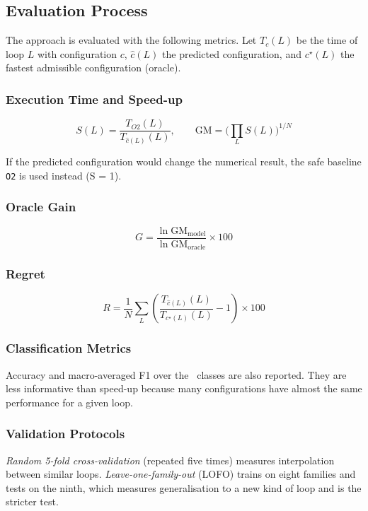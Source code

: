 \subsection{Evaluation Process}

The approach is evaluated with the following metrics. Let $T_c(L)$ be the time of
loop $L$ with configuration $c$, $\hat c(L)$ the predicted configuration, and
$c^{\star}(L)$ the fastest admissible configuration (oracle).

\subsubsection{Execution Time and Speed-up}

\[
S(L)=\frac{T_{O2}(L)}{T_{\hat c(L)}(L)} ,\qquad
\mathrm{GM}=\Big(\prod_{L} S(L)\Big)^{1/N}
\]

If the predicted configuration would change the numerical result, the safe baseline
\texttt{O2} is used instead (S = 1).

\subsubsection{Oracle Gain}

\[
G=\frac{\ln \mathrm{GM}_{\text{model}}}{\ln \mathrm{GM}_{\text{oracle}}}\times100
\]

\subsubsection{Regret}

\[
R=\frac{1}{N}\sum_L\left(\frac{T_{\hat c(L)}(L)}{T_{c^{\star}(L)}(L)}-1\right)\times100
\]

\subsubsection{Classification Metrics}

Accuracy and macro-averaged F1 over the \numConfigs\ classes are also reported.
They are less informative than speed-up because many configurations have almost the
same performance for a given loop.

\subsubsection{Validation Protocols}

\emph{Random 5-fold cross-validation} (repeated five times) measures interpolation
between similar loops. \emph{Leave-one-family-out} (LOFO) trains on eight families
and tests on the ninth, which measures generalisation to a new kind of loop and is
the stricter test.

